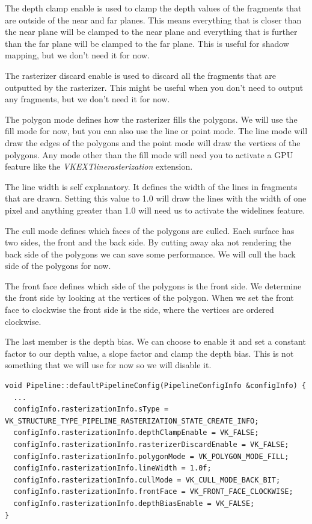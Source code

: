 \documentclass[12pt]{report} \usepackage{preamble}
\begin{document}
The depth clamp enable is used to clamp the depth values of the fragments that are outside of the near and far planes.
This means everything that is closer than the near plane will be clamped to the near plane and everything that is further
than the far plane will be clamped to the far plane. This is useful for shadow mapping, but we don't need it for now.

The rasterizer discard enable is used to discard all the fragments that are outputted by the rasterizer. This might be
useful when you don't need to output any fragments, but we don't need it for now.

The polygon mode defines how the rasterizer fills the polygons. We will use the fill mode for now, but you can also use
the line or point mode. The line mode will draw the edges of the polygons and the point mode will draw the vertices of the
polygons. Any mode other than the fill mode will need you to activate a \ac{GPU} feature like the
\textit{VK\textunderscore EXT\textunderscore line\textunderscore rasterization} extension.

The line width is self explanatory. It defines the width of the lines in fragments that are drawn. Setting this
value to 1.0 will draw the lines with the width of one pixel and anything greater than 1.0 will need us to activate
the widelines feature.

The cull mode defines which faces of the polygons are culled. Each surface has two sides, the front and the back side.
By cutting away aka not rendering the back side of the polygons we can save some performance. We will cull the back side
of the polygons for now.

The front face defines which side of the polygons is the front side. We determine the front side by looking at the
vertices of the polygon. When we set the front face to clockwise the front side is the side, where the vertices are
ordered clockwise.

The last member is the depth bias. We can choose to enable it and set a constant factor to our depth value, a slope factor
and clamp the depth bias. This is not something that we will use for now so we will disable it.

\begin{lstlisting}[Language=C++]
void Pipeline::defaultPipelineConfig(PipelineConfigInfo &configInfo) {
  ...
  configInfo.rasterizationInfo.sType = VK_STRUCTURE_TYPE_PIPELINE_RASTERIZATION_STATE_CREATE_INFO;
  configInfo.rasterizationInfo.depthClampEnable = VK_FALSE;
  configInfo.rasterizationInfo.rasterizerDiscardEnable = VK_FALSE;
  configInfo.rasterizationInfo.polygonMode = VK_POLYGON_MODE_FILL;
  configInfo.rasterizationInfo.lineWidth = 1.0f;
  configInfo.rasterizationInfo.cullMode = VK_CULL_MODE_BACK_BIT;
  configInfo.rasterizationInfo.frontFace = VK_FRONT_FACE_CLOCKWISE;
  configInfo.rasterizationInfo.depthBiasEnable = VK_FALSE;
}
\end{lstlisting}
\end{document}
